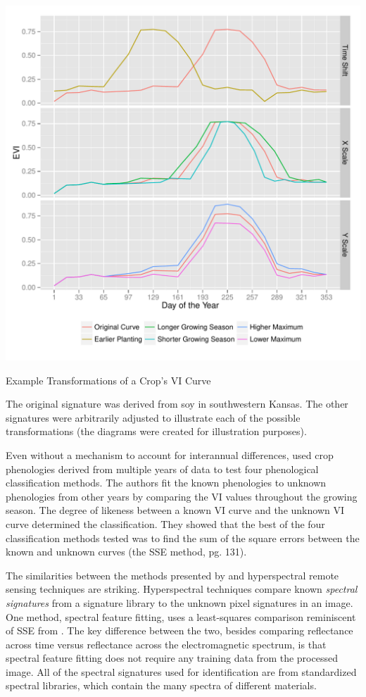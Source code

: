 \begin{ssfigure}
  \centering
  \includegraphics[width=\textwidth]{Graphics/transformations.pdf}
  \caption{Example Transformations of a Crop's VI Curve}
  \medskip
  \small
  The original signature was derived from soy in southwestern Kansas. The other signatures were arbitrarily adjusted to illustrate each of the possible transformations (the diagrams were created for illustration purposes).
  \label{fig:transformations}
\end{ssfigure}

Even without a mechanism to account for interannual differences, \textcite{brown2007multitemporal} used crop phenologies derived from multiple years of data to test four phenological classification methods. The authors fit the known phenologies to unknown phenologies from other years by comparing the VI values throughout the growing season. The degree of likeness between a known VI curve and the unknown VI curve determined the classification. They showed that the best of the four classification methods tested was to find the sum of the square errors between the known and unknown curves (the SSE method, \citeauthor{brown2007multitemporal} pg. 131).

The similarities between the methods presented by \citeauthor{brown2007multitemporal} and hyperspectral remote sensing techniques are striking. Hyperspectral techniques compare known \textit{spectral signatures} from a signature library to the unknown pixel signatures in an image. One method, spectral feature fitting, uses a least-squares comparison reminiscent of SSE from \citeauthor{brown2007multitemporal} \autocites{solutions2013selected}{clark2003imaging}. The key difference between the two, besides comparing reflectance across time versus reflectance across the electromagnetic spectrum, is that spectral feature fitting does not require any training data from the processed image. All of the spectral signatures used for identification are from standardized spectral libraries, which contain the many spectra of different materials.

